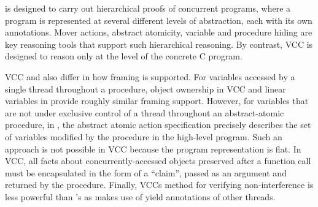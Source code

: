 \civl is designed to carry out hierarchical proofs of concurrent programs, where a program is represented at several different levels of abstraction, each with its own annotations.  Mover actions, abstract atomicity, variable and procedure hiding are key reasoning tools that support such hierarchical reasoning. By contrast, VCC is designed to reason only at the level of the concrete C program.

VCC and \civl also differ in how framing is supported. For variables accessed by a single thread throughout a procedure, object ownership in VCC and linear variables in \civl provide roughly similar framing support. However, for variables that are not under exclusive control of a thread throughout an abstract-atomic procedure, in \civl, the abstract atomic action specification precisely describes the set of variables modified by the procedure in the high-level program. Such an approach is not possible in VCC because the program representation is flat.  In VCC, all facts about concurrently-accessed objects preserved after a function call must be encapsulated in the form of a ``claim'', passed as an argument and returned by the procedure. Finally, VCCs method for verifying non-interference is less powerful than \civl's as \civl makes use of yield annotations of other threads.

